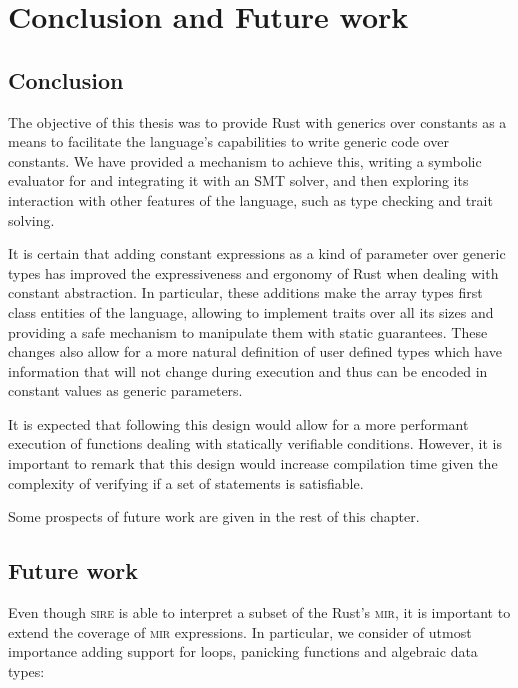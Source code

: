 \chapter{Conclusion and Future work}
\label{chap:conclusion}

\section{Conclusion}

The objective of this thesis was to provide Rust with generics over constants
as a means to facilitate the language's capabilities to write generic code over
constants. We have provided a mechanism to achieve this, writing a symbolic
evaluator for  and integrating it with an SMT solver, and then
exploring its interaction with other features of the language, such as type
checking and trait solving.

It is certain that adding constant expressions as a kind of parameter over
generic types has improved the expressiveness and ergonomy of Rust when dealing
with constant abstraction. In particular, these additions make the array types
first class entities of the language, allowing to implement traits over all its
sizes and providing a safe mechanism to manipulate them with static guarantees.
These changes also allow for a more natural definition of user defined types
which have information that will not change during execution and thus can be
encoded in constant values as generic parameters.

It is expected that following this design would allow for a more performant
execution of functions dealing with statically verifiable conditions. However,
it is important to remark that this design would increase compilation time
given the complexity of verifying if a set of statements is satisfiable.

Some prospects of future work are given in the rest of this chapter.


\section{Future work}

Even though \textsc{sire} is able to interpret a subset of the Rust's
\textsc{mir}, it is important to extend the coverage of \textsc{mir}
expressions. In particular, we consider of utmost importance adding support for
loops, panicking functions and algebraic data types:

